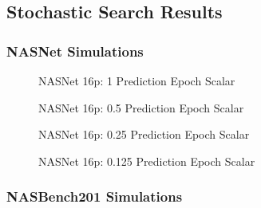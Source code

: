 \documentclass[twocolumn]{article}
\begin{document}
\subsection{Stochastic Search Results}
\clearpage
\subsubsection{NASNet Simulations}

\begin{figure}[!h]
    \begin{center}
        \resizebox{0.9\columnwidth}{!}{
             
        }
        \caption{NASNet 16p: 1 Prediction Epoch Scalar}
        \label{fig:nasnet_1x_acceleration}
    \end{center}
\end{figure}

\begin{figure}[!h]
    \begin{center}
        \resizebox{0.95\columnwidth}{!}{
             
        }
        \caption{NASNet 16p: 0.5 Prediction Epoch Scalar}
        \label{fig:nasnet_2x_acceleration}
    \end{center}
\end{figure}
        
\begin{figure}[!h]
    \begin{center}
        \resizebox{0.95\columnwidth}{!}{
            
        }
        \caption{NASNet 16p: 0.25 Prediction Epoch Scalar}
        \label{fig:nasnet_4x_acceleration}
    \end{center}
\end{figure}

\begin{figure}[!h]
    \begin{center}
        \resizebox{0.95\columnwidth}{!}{
            
        }
        \caption{NASNet 16p: 0.125 Prediction Epoch Scalar}
        \label{fig:nasnet_8x_acceleration}
    \end{center}
\end{figure}

\FloatBarrier
\clearpage
\subsubsection{NASBench201 Simulations}
\end{document}
